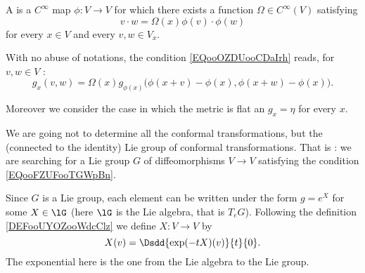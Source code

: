 \begin{definition}      \label{DEFooVKNBooFBWQQM}
    A  is a \(  C^{\infty}\) map \( \phi\colon V\to V\) for which there exists a function \( \Omega\in C^{\infty}(V)\) satisfying
    \begin{equation}        \label{EQooOZDUooCDaIrh}
        v\cdot w=\Omega(x) \phi(v)\cdot \phi(w)
    \end{equation}
    for every \( x\in V\) and every \( v,w\in V_x\).
\end{definition}
With no abuse of notations, the condition \eqref{EQooOZDUooCDaIrh} reads, for \( v,w\in V\) :
\begin{equation}\label{EQooFZUFooTGWpBn}
    g_x(v,w)=\Omega(x)g_{\phi(x)}\big(  \phi(x+v)-\phi(x),\phi(x+w)-\phi(x)  \big).
\end{equation}

Moreover we consider the case in which the metric is flat an \( g_x=\eta\) for every \( x\).

\begin{normaltext}
    We are going not to determine all the conformal transformations, but the (connected to the identity) Lie group of conformal transformations. That is : we are searching for a Lie group \( G\) of diffeomorphisms \( V\to V\) satisfying the condition \eqref{EQooFZUFooTGWpBn}.
\end{normaltext}

Since \( G\) is a Lie group, each element can be written under the form \( g= e^{X}\) for some \( X\in\lG\) (here \( \lG\) is the Lie algebra, that is \( T_eG\)). Following the definition \ref{DEFooUYOZooWdcClz} we define \( X\colon V\to V\) by
\begin{equation}
    X(v)=\Dsdd{  \exp(-tX)(v) }{t}{0}.
\end{equation}
The exponential here is the one from the Lie algebra to the Lie group. 


